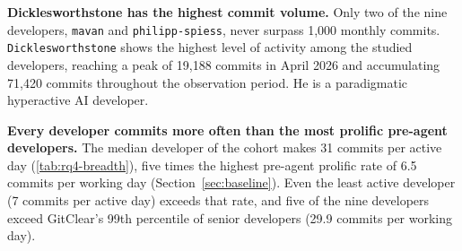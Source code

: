 \documentclass[smallextended]{svjour3}
\begin{document}
\textbf{Dicklesworthstone has the highest commit volume.} Only two of the nine developers, \ie
\texttt{mavan} and \texttt{philipp-spiess}, never surpass 1,000 monthly commits.
\texttt{Dicklesworthstone} shows the highest level of activity among the studied
developers, reaching a peak of 19,188 commits in April 2026 and accumulating
71,420 commits throughout the observation period. He is a paradigmatic hyperactive AI developer.

\textbf{Every developer commits more often than the most prolific pre-agent developers.}
The median developer of the cohort makes 31 commits per active day (\autoref{tab:rq4-breadth}), five times the highest pre-agent prolific rate of 6.5 commits per working day (Section~\ref{sec:baseline}).
Even the least active developer (7 commits per active day) exceeds that rate, and five of the nine developers exceed GitClear's 99th percentile of senior developers (29.9 commits per working day).
\end{document}
